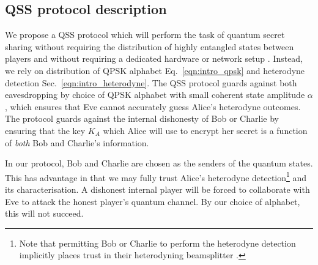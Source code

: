 \subsection{QSS protocol description}

We propose a QSS protocol which will perform the task of quantum secret sharing without requiring the distribution of highly entangled states between players \cite{Kogias2017} and without requiring a dedicated hardware or network setup \cite{Grice2019}. Instead, we rely on distribution of QPSK alphabet Eq.~\ref{eqn:intro_qpsk} and heterodyne detection Sec.~\ref{eqn:intro_heterodyne}. The QSS protocol guards against both eavesdropping by choice of QPSK alphabet with small coherent state amplitude $\alpha$, which ensures that Eve cannot accurately guess Alice's heterodyne outcomes. The protocol guards against the internal dishonesty of Bob or Charlie by ensuring that the key $K_A$ which Alice will use to encrypt her secret is a function of \emph{both} Bob and Charlie's information.%

In our protocol, Bob and Charlie are chosen as the senders of the quantum states. This has advantage in that we may fully trust Alice's heterodyne detection\footnote{Note that permitting Bob or Charlie to perform the heterodyne detection implicitly places trust in their heterodyning beamsplitter \cite{Walk2016a}.} and its characterisation. A dishonest internal player will be forced to collaborate with Eve to attack the honest player's quantum channel. By our choice of alphabet, this will not succeed.


